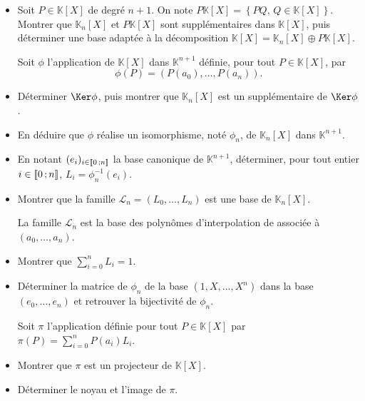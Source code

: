 \begin{exercice}
\begin{itemize}
\item Soit $P \in \mathbb{K}[X]$ de degré $n+1$. On note $P \mathbb{K}[X] = \left\{P Q,\, Q \in \mathbb{K}[X]\right\}$. Montrer que $\mathbb{K}_n[X]$ et $P \mathbb{K}[X]$ sont supplémentaires dans $\mathbb{K}[X]$, puis déterminer une base adaptée à la décomposition $\mathbb{K}[X] = \mathbb{K}_n[X] \oplus P \mathbb{K}[X]$.

\medskip

Soit $\phi$ l'application de $\mathbb{K}[X]$ dans $\mathbb{K}^{n+1}$ définie, pour tout $P \in \mathbb{K}[X]$, par
\[
\phi(P) = (P(a_0),\ldots,P(a_n)).
\]

\item Déterminer $\Ker \phi$, puis montrer que $\mathbb{K}_n[X]$ est un supplémentaire de $\Ker \phi$.

\item En déduire que $\phi$ réalise un isomorphisme, noté $\phi_n$, de $\mathbb{K}_n[X]$ dans $\mathbb{K}^{n+1}$.

\item En notant $(e_i)_{i\in\llbracket 0\,; n \rrbracket}$ la base canonique de $\mathbb{K}^{n+1}$, déterminer, pour tout entier $i \in \llbracket 0\,; n \rrbracket$, $L_i = \phi_n^{-1}(e_i)$.

\item Montrer que la famille $\mathscr{L}_n = (L_0,\ldots,L_n)$ est une base de $\mathbb{K}_n[X]$.

La famille $\mathscr{L}_n$ est la base des polynômes d'interpolation de \cite{Lagrange} associée à $(a_0,\ldots,a_n)$.
\item Montrer que $\sum_{i=0}^n L_i = 1$.

\smallskip

\item Déterminer la matrice de $\phi_n$ de la base $(1,X,\ldots,X^n)$ dans la base $(e_0,\ldots,e_n)$ et retrouver la bijectivité de $\phi_n$.

\smallskip


\smallskip

Soit $\pi$ l'application définie pour tout $P \in \mathbb{K}[X]$ par $\pi(P) = \sum_{i=0}^n P(a_i) L_i$.

\item Montrer que $\pi$ est un projecteur de $\mathbb{K}[X]$.

\item Déterminer le noyau et l'image de $\pi$.
\end{itemize}
\end{exercice}

